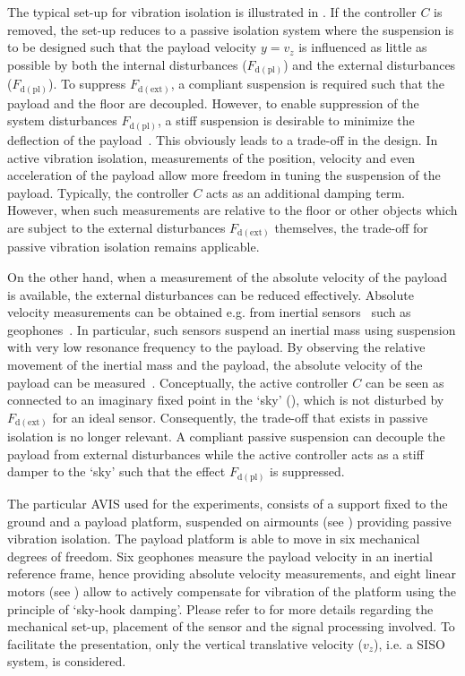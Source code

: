 The typical set-up for vibration isolation is illustrated in .
If the controller $C$ is removed, the set-up reduces to a passive isolation system where the suspension is to be designed such that the payload velocity $y=v_z$ is influenced as little as possible by both the internal disturbances ($F_{\mathrm{d(pl)}}$) and the external disturbances ($F_{\mathrm{d(pl)}}$).
To suppress $F_{\mathrm{d(ext)}}$, a compliant suspension is required such that the payload and the floor are decoupled.
However, to enable suppression of the system disturbances $F_{\mathrm{d(pl)}}$, a stiff suspension is desirable to minimize the deflection of the payload~\citep{Voorhoeve2015SYSID}.
This obviously leads to a trade-off in the design.
In active vibration isolation, measurements of the position, velocity and even acceleration of the payload allow more freedom in tuning the suspension of the payload.
Typically, the controller $C$ acts as an additional damping term.
However, when such measurements are relative to the floor or other objects which are subject to the external disturbances $F_{\mathrm{d(ext)}}$ themselves, the trade-off for passive vibration isolation remains applicable.

On the other hand, when a measurement of the absolute velocity of the payload is available, the external disturbances can be reduced effectively.
Absolute velocity measurements can be obtained e.g. from inertial sensors~\citep{Collette2011} such as geophones~\citep{Rademakers2005MSc,vanderMaas2011MSc}.
In particular, such sensors suspend an inertial mass using suspension with very low resonance frequency to the payload.
By observing the relative movement of the inertial mass and the payload, the absolute velocity of the payload can be measured~\citep{Collette2011}.
Conceptually, the active controller $C$ can be seen as connected to an imaginary fixed point in the `sky' (), which is not disturbed by $F_{\mathrm{d(ext)}}$ for an ideal sensor.
Consequently, the trade-off that exists in passive isolation is no longer relevant.
A compliant passive suspension can decouple the payload from external disturbances while the active controller acts as a stiff damper to the `sky' such that the effect $F_{\mathrm{d(pl)}}$ is suppressed.

The particular \gls{AVIS} used for the experiments, consists of a support fixed to the ground and a payload platform, suspended on airmounts (see ) providing passive vibration isolation.
The payload platform is able to move in six mechanical degrees of freedom.
Six geophones measure the payload velocity in an inertial reference frame, hence providing absolute velocity measurements, and eight linear motors (see ) allow to actively compensate for vibration of the platform using the principle of `sky-hook damping'.
Please refer to  for more details regarding the mechanical set-up, placement of the sensor and the signal processing involved.
To facilitate the presentation, only the vertical translative velocity ($v_z$), i.e. a \gls{SISO} system, is considered.

